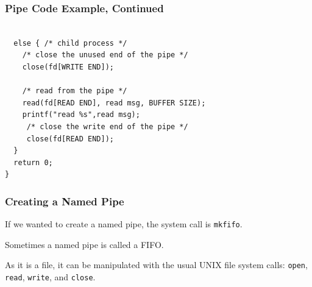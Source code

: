 \begin{frame}[fragile]
\frametitle{Pipe Code Example, Continued}


\begin{verbatim}

  else { /* child process */
    /* close the unused end of the pipe */ 
    close(fd[WRITE END]);
    
    /* read from the pipe */
    read(fd[READ END], read msg, BUFFER SIZE); 
    printf("read %s",read msg);
     /* close the write end of the pipe */
     close(fd[READ END]);
  }
  return 0;
}
\end{verbatim}

\end{frame}

\begin{frame}
\frametitle{Creating a Named Pipe}

If we wanted to create a named pipe, the system call is \texttt{mkfifo}. 

Sometimes a named pipe is called a FIFO. 

As it is a file, it can be manipulated with the usual UNIX file system calls: \texttt{open}, \texttt{read}, \texttt{write}, and \texttt{close}.

\end{frame}



